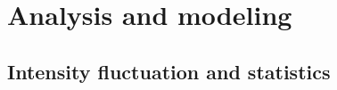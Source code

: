 \chapter{Analysis and modeling}
\label{ch:analysis}


\section{ Intensity fluctuation and statistics}

